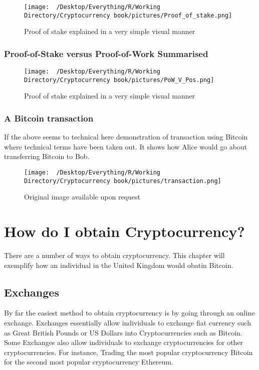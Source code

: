\documentclass[]{book}
\theoremstyle{definition}
\theoremstyle{definition}
\theoremstyle{definition}
\theoremstyle{remark}
\begin{document}
\begin{figure}[htbp]
\centering
\texttt{[image: ~/Desktop/Everything/R/Working Directory/Cryptocurrency book/pictures/Proof\_of\_stake.png]}
\caption{Proof of stake explained in a very simple visual manner}
\end{figure}

\subsection{Proof-of-Stake versus Proof-of-Work
Summarised}\label{proof-of-stake-versus-proof-of-work-summarised}

\begin{figure}[htbp]
\centering
\texttt{[image: ~/Desktop/Everything/R/Working Directory/Cryptocurrency book/pictures/PoW\_V\_Pos.png]}
\caption{Proof of stake explained in a very simple visual manner}
\end{figure}

\subsection{A Bitcoin transaction}\label{a-bitcoin-transaction}

If the above seems to technical here demonstration of transaction using
Bitcoin where technical terms have been taken out. It shows how Alice
would go about transferring Bitcoin to Bob.

\begin{figure}[htbp]
\centering
\texttt{[image: ~/Desktop/Everything/R/Working Directory/Cryptocurrency book/pictures/transaction.png]}
\caption{Original image available upon request}
\end{figure}

\chapter{How do I obtain
Cryptocurrency?}\label{how-do-i-obtain-cryptocurrency}

There are a number of ways to obtain cryptocurrency. This chapter will
exemplify how an individual in the United Kingdom would obatin Bitcoin.

\section{Exchanges}\label{exchanges}

By far the easiest method to obtain cryptocurrency is by going through
an online exchange. Exchanges essentially allow individuals to exchange
fiat currency such as Great British Pounds or US Dollars into
Cryptocurrencies such as Bitcoin. Some Exchanges also allow individuals
to exchange cryptocurrencies for other cryptocurrencies. For instance,
Trading the most popular cryptocurrency Bitcoin for the second most
popular cryptocurrency Ethereum.
\end{document}
